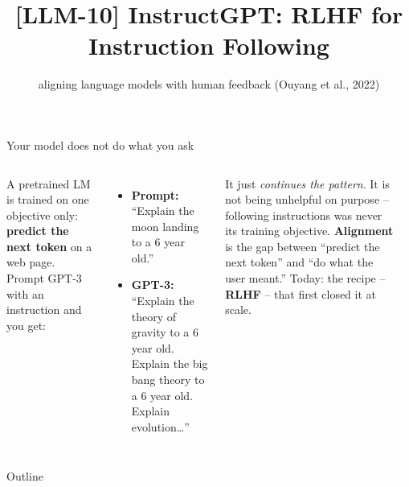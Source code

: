 \documentclass[aspectratio=169]{beamer}
\title{[LLM-10] InstructGPT: RLHF for Instruction Following}
\subtitle{aligning language models with human feedback \quad(Ouyang et al., 2022)}
\date{}
\begin{document}
\begin{frame}{Your model does not do what you ask}
  \begin{columns}[T]
    A pretrained LM is trained on one objective only: \textbf{predict the next token}
    on a web page. Prompt GPT-3 with an instruction and you get:
    \vskip 4pt
    \begin{itemize}\small
      \item \textbf{Prompt:} ``Explain the moon landing to a 6 year old.''
      \item \textbf{GPT-3:} ``Explain the theory of gravity to a 6 year old.
        Explain the big bang theory to a 6 year old. Explain evolution\dots''
    \end{itemize}
    \vskip 4pt
    It just \emph{continues the pattern}. It is not being unhelpful on purpose --
    following instructions was never its training objective.
    \vskip 8pt
    \textbf{Alignment} is the gap between ``predict the next token'' and ``do what the
    user meant.'' Today: the recipe -- \textbf{RLHF} -- that first closed it at scale.
    \begin{center}
    \end{center}
  \end{columns}
\end{frame}

\begin{frame}{Outline}
  \tableofcontents
\end{frame}
\end{document}
